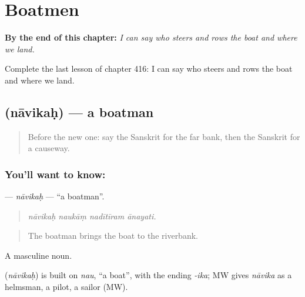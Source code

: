 
\chapter{Boatmen}
\label{ch:sa-boatmen}

\begin{chapteropening}
\textbf{By the end of this chapter:} \emph{I can say who steers and rows the boat and where we land.}

Complete the last lesson of chapter 416: I can say who steers and rows the boat and where we land.
\end{chapteropening}

\section[\texorpdfstring{\sk{नाविकः} (nāvikaḥ)}{नाविकः (nāvikaḥ)}]{ (nāvikaḥ) — a boatman}

\label{lesson:SA-C416-navikah}



\begin{quote}
Before the new one: say the Sanskrit for the far bank, then the Sanskrit for a causeway.
\end{quote}

\subsection*{You'll want to know: }
\textbf{} — \emph{nāvikaḥ} — \textquotedblleft{}a boatman\textquotedblright{}.

\begin{quote}
   
\end{quote}

\begin{quote}
\emph{nāvikaḥ naukāṃ nadītīram ānayati.}
\end{quote}

\begin{quote}
The boatman brings the boat to the riverbank.
\end{quote}

A masculine noun.

\begin{cousinweb}
\textbf{} (\emph{nāvikaḥ}) is built on \emph{nau}, \textquotedblleft{}a boat\textquotedblright{}, with the ending \emph{-ika}; MW gives \emph{nāvika} as a helmsman, a pilot, a sailor (MW).
\end{cousinweb}


